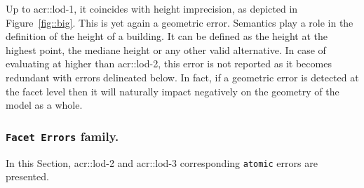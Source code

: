                 \begin{figure}[htb]
                    \centering
                \end{figure}

                Up to \gls{acr::lod}-1, it coincides with height imprecision, as depicted in Figure~\ref{fig::big}.
                This is yet again a geometric error.
                Semantics play a role in the definition of the height of a building.
                It can be defined as the height at the highest point, the mediane height or any other valid alternative.
                In case of evaluating at higher than \gls{acr::lod}-2, this error is not reported as it becomes redundant with errors delineated below.
                In fact, if a geometric error is detected at the facet level then it will naturally impact negatively on the geometry of the model as a whole.
            
        \subsubsection{\texttt{Facet Errors} family.}
            In this Section, \gls{acr::lod}-2 and \gls{acr::lod}-3 corresponding \texttt{atomic} errors are presented.

